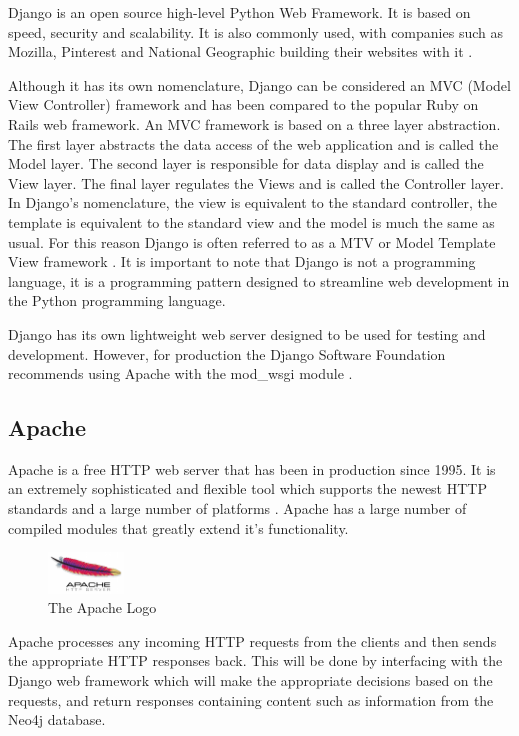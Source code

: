 \documentclass[10pt,onecolumn]{article}
\begin{document}
Django is an open source high-level Python Web Framework. It is based on speed, security and scalability. It is also commonly used, with companies such as Mozilla, Pinterest and National Geographic building their websites with it \cite{django}. 

Although it has its own nomenclature, Django can be considered an MVC (Model View Controller) framework and has been compared to the popular Ruby on Rails web framework. An MVC framework is based on a three layer abstraction. The first layer abstracts the data access of the web application and is called the Model layer. The second layer is responsible for data display and is called the View layer. The final layer regulates the Views and is called the Controller layer. In Django's nomenclature, the view is equivalent to the standard controller, the template is equivalent to the standard view and the model is much the same as usual. For this reason Django is often referred to as a MTV or Model Template View framework \cite{djangobook}. It is important to note that Django is not a programming language, it is a programming pattern designed to streamline web development in the Python programming language.

Django has its own lightweight web server designed to be used for testing and development. However, for production the Django Software Foundation recommends using Apache with the mod\_wsgi module \cite{djangoApache}.
\subsection{Apache}

Apache is a free HTTP web server that has been in production since 1995. It is an extremely sophisticated and flexible tool which supports the newest HTTP standards and a large number of platforms \cite{apache}. Apache has a large number of compiled modules that greatly extend it's functionality. 
\begin{figure}
  \begin{center}
    \includegraphics[width=0.18\textwidth]{apache}
  \end{center}
  \caption{The Apache Logo}
\end{figure}


Apache processes any incoming HTTP requests from the clients and then sends the appropriate HTTP responses back. This will be done by interfacing with the Django web framework which will make the appropriate decisions based on the requests, and return responses containing content such as information from the Neo4j database. 
\end{document}

